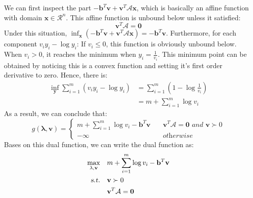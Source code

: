 \documentclass[10pt,a4paper]{article}
\begin{document}
We can first inspect the part $- \mathbf{b}^{T} \mathbf{v} + \mathbf{v}^{T} \mathcal{A} \mathbf{x}$, which is basically an affine function with domain $\mathbf{x} \in \mathcal{R}^{n}$. This affine function is unbound below unless it satisfied:
\begin{equation*}
	\mathbf{v}^{T} \mathcal{A} = \mathbf{0}
\end{equation*}
Under this situation, $\displaystyle\inf_{\mathbf{x}}(- \mathbf{b}^{T} \mathbf{v} + \mathbf{v}^{T} \mathcal{A} \mathbf{x}) = -\mathbf{b}^{T} \mathbf{v}$. Furthermore, for each component $v_{i}y_{i} - \log y_{i}$: If $v_{i} \leq 0$, this function is obviously unbound below. When $v_{i} > 0$, it reaches the minimum when $y_{i} = \frac{1}{v_{i}}$. This minimum point can be obtained by noticing this is a convex function and setting it's first order derivative to zero. Hence, there is:
\begin{equation}
	\begin{aligned}
		\displaystyle\inf_{\mathbf{y}}\displaystyle\sum_{i = 1}^{m}(v_{i} y_{i} - \log y_{i}) &= \displaystyle\sum_{i = 1}^{m}(1 - \log \frac{1}{v_{i}}) \\
		&= m + \displaystyle\sum_{i = 1}^{m} \log v_{i}
	\end{aligned}
\end{equation} 
As a result, we can conclude that:
\begin{equation}
	g(\mathbf{\lambda}, \mathbf{v}) = 
	\begin{cases}
		m + \displaystyle\sum_{i = 1}^{m} \log v_{i} - \mathbf{b}^{T} \mathbf{v} \quad & \mathbf{v}^{T} \mathcal{A} = \mathbf{0} \textit{ and } \mathbf{v} \succ 0 \\
		-\infty \quad & \textit{otherwise}
	\end{cases}
\end{equation}
Bases on this dual function, we can write the dual function as:
\begin{equation}
	\begin{aligned}
		\displaystyle\max_{\mathbf{\lambda}, \mathbf{v}} \quad & m + \displaystyle\sum_{i = 1}^{m} \log v_{i} - \mathbf{b}^{T} \mathbf{v} \\
		\textsl{s.t.} \quad & \mathbf{v} \succ 0 \\
		& \mathbf{v}^{T} \mathcal{A} = \mathbf{0}
	\end{aligned}
\end{equation}
\end{document}
